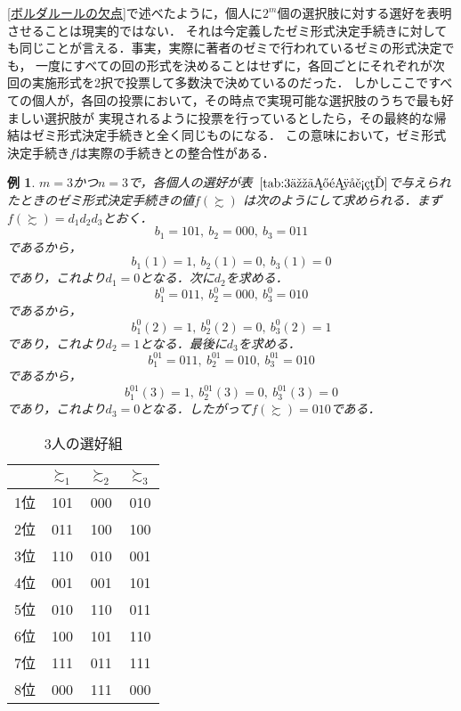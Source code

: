 \documentclass[dvipdfmx]{jsarticle}
\newtheorem{example}{例}
\begin{document}
\ref{ボルダルールの欠点}で述べたように，個人に$2^m$個の選択肢に対する選好を表明させることは現実的ではない．
それは今定義したゼミ形式決定手続きに対しても同じことが言える．事実，実際に著者のゼミで行われているゼミの形式決定でも，
一度にすべての回の形式を決めることはせずに，各回ごとにそれぞれが次回の実施形式を2択で投票して多数決で決めているのだった．
しかしここですべての個人が，各回の投票において，その時点で実現可能な選択肢のうちで最も好ましい選択肢が
実現されるように投票を行っているとしたら，その最終的な帰結はゼミ形式決定手続きと全く同じものになる．
この意味において，ゼミ形式決定手続き$f$は実際の手続きとの整合性がある．

\begin{example}
$m=3$かつ$n=3$で，各個人の選好が表~$\ref{tab:3人の選好組}$で与えられたときのゼミ形式決定手続きの値$f(\succsim)$
は次のようにして求められる．まず$f(\succsim) = d_1d_2d_3$とおく．
\[
  b_1 = 101,\ b_2 = 000,\ b_3 = 011
\]
であるから，
\[
  b_1(1) = 1,\ b_2(1) = 0,\ b_3(1) = 0
\]
であり，これより$d_1 = 0$となる．次に$d_2$を求める．
\[
  b_1^0 = 011,\ b_2^0 = 000,\ b_3^0 = 010
\]
であるから，
\[
  b_1^0(2) = 1,\ b_2^0(2) = 0,\ b_3^0(2) = 1
\]
であり，これより$d_2 = 1$となる．最後に$d_3$を求める．
\[
  b_1^{01} = 011,\ b_2^{01} = 010,\ b_3^{01} = 010
\]
であるから，
\[
  b_1^{01}(3) = 1,\ b_2^{01}(3) = 0,\ b_3^{01}(3) = 0
\]
であり，これより$d_3 = 0$となる．したがって$f(\succsim) = 010$である．
  
\end{example}

\begin{table}[h]
  \begin{center}
  \caption{3人の選好組}\label{tab:3人の選好組}
  \begin{tabular}{c|c|c|c} \hline
    & $\succsim_1$ & $\succsim_2$ & $\succsim_3$ \\ \hline
  1位 & 101 & 000 & 010 \\
  2位 & 011 & 100 & 100 \\
  3位 & 110 & 010 & 001 \\
  4位 & 001 & 001 & 101 \\
  5位 & 010 & 110 & 011 \\
  6位 & 100 & 101 & 110 \\
  7位 & 111 & 011 & 111 \\
  8位 & 000 & 111 & 000 \\ \hline 
  \end{tabular}
\end{center}
\end{table}
\end{document}
